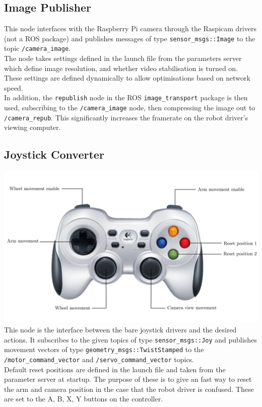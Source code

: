 \documentclass[titlepage,12pt,a4paper]{article}
\begin{document}
\subsection{Image Publisher}
This node interfaces with the Raspberry Pi camera through the Raspicam drivers (not a ROS package) and publishes messages of type \texttt{sensor\_msgs::Image} to the topic \texttt{/camera\_image}.\\

\noindent The node takes settings defined in the launch file from the parameters server which define image resolution, and whether video stabilisation is turned on. These settings are defined dynamically to allow optimisations based on network speed.\\

\noindent In addition, the \texttt{republish} node in the ROS \texttt{image\_transport} package is then used, subscribing to the \texttt{/camera\_image} node, then compressing the image out to \texttt{/camera\_repub}. This significantly increases the framerate on the robot driver's viewing computer.

\subsection{Joystick Converter}
\includegraphics[width=\textwidth]{gamepadedit}
This node is the interface between the bare joystick drivers and the desired actions. It subscribes to the given topics of type \texttt{sensor\_msgs::Joy} and publishes movement vectors of type \texttt{geometry\_msgs::TwistStamped} to the \texttt{/motor\_command\_vector} and \texttt{/servo\_command\_vector} topics.\\

\noindent Default reset positions are defined in the launch file and taken from the parameter server at startup. The purpose of these is to give an fast way to reset the arm and camera position in the case that the robot driver is confused. These are set to the A, B, X, Y buttons on the controller. \\
\end{document}
